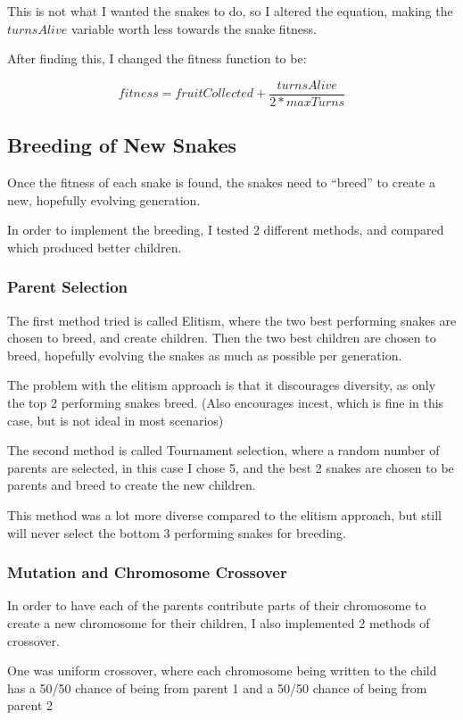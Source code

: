 \documentclass[12pt]{article}
\begin{document}
This is not what I wanted the snakes to do, so I altered the equation, making the $turnsAlive$ variable worth less towards the snake fitness. 

After finding this, I changed the fitness function to be:

      \[fitness = fruitCollected + \frac{turnsAlive}{2*maxTurns}\]
      
\subsection{Breeding of New Snakes}

Once the fitness of each snake is found, the snakes need to ``breed'' to create a new, hopefully evolving generation.

In order to implement the breeding, I tested 2 different methods, and compared which produced better children.

\subsubsection{Parent Selection}
The first method tried is called Elitism, where the two best performing snakes are chosen to breed, and create children. Then the two best children are chosen to breed, hopefully evolving the snakes as much as possible per generation.

The problem with the elitism approach is that it discourages diversity, as only the top 2 performing snakes breed. (Also encourages incest, which is fine in this case, but is not ideal in most scenarios)

The second method is called Tournament selection, where a random number of parents are selected, in this case I chose 5, and the best 2 snakes are chosen to be parents and breed to create the new children.

This method was a lot more diverse compared to the elitism approach, but still will never select the bottom 3 performing snakes for breeding.

\subsubsection{Mutation and Chromosome Crossover}
In order to have each of the parents contribute parts of their chromosome to create a new chromosome for their children, I also implemented 2 methods of crossover.

One was uniform crossover, where each chromosome being written to the child has a 50/50 chance of being from parent 1 and a 50/50 chance of being from parent 2
\end{document}
